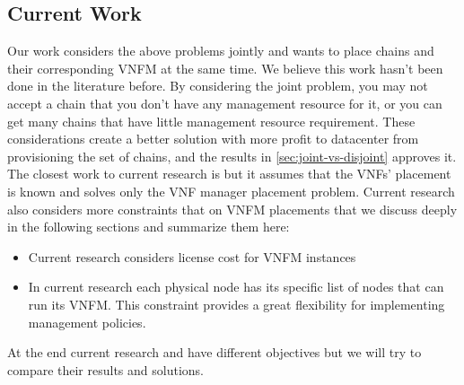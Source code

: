 \subsection{Current Work}

Our work considers the above problems jointly and wants to place chains and their corresponding VNFM at the same time.
We believe this work hasn't been done in the literature before.
By considering the joint problem, you may not accept a chain that you don't have any management resource for it,
or you can get many chains that have little management resource requirement.
These considerations create a better solution with more profit to datacenter from provisioning the set of chains,
and the results in \ref{sec:joint-vs-disjoint} approves it.
The closest work to current research is \cite{AbuLebdeh2017} but it assumes that the VNFs' placement is known and solves only the VNF manager placement problem. Current research also considers more constraints that \cite{AbuLebdeh2017} on VNFM placements that we discuss deeply in the following sections and summarize them here:

\begin{itemize}
    \item Current research considers license cost for VNFM instances
    \item In current research each physical node has its specific list of nodes that can run its VNFM. This constraint provides a great flexibility for implementing management policies.
\end{itemize}

At the end current research and \cite{AbuLebdeh2017} have different objectives but we will try to compare their results and solutions.

